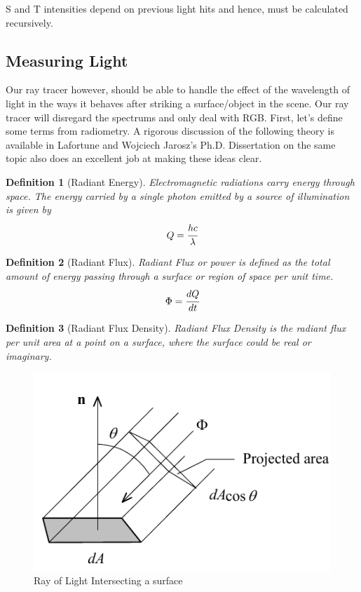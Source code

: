 \documentclass[a4paper, 12pt]{article}
\newtheorem{definition}{Definition}
\begin{document}
S and T intensities depend on previous light hits and hence, must be calculated 
recursively.

\subsection{Measuring Light}
Our ray tracer however, should be able to handle the effect of 
the wavelength of light in the ways it behaves after striking 
a surface/object in the scene. Our 
ray tracer will disregard the spectrums and 
only deal with RGB. First, let's define some terms from radiometry.
A rigorous discussion of the following theory is available in 
Lafortune\cite{Lafortune1995MathematicalMA} and Wojciech Jarosz's Ph.D. 
Dissertation\cite{jarosz08thesis} on the same topic also does an excellent job
at making these ideas clear.

\begin{definition}[Radiant Energy]
Electromagnetic radiations carry energy through space.
The energy carried by a single photon emitted by a source 
of illumination is given by 
$$
	Q = \cfrac{hc}{\lambda}
$$
\end{definition}

\begin{definition}[Radiant Flux]
Radiant Flux or power is defined as the total amount of energy passing 
through a surface or region of space per unit time.
$$
	\Phi = \cfrac{dQ}{dt}
$$
\end{definition}

\begin{definition}[Radiant Flux Density]
	Radiant Flux Density is the radiant flux per unit area at a 
	point on a surface, where the surface could be real or imaginary.
\end{definition}

\begin{center}
\begin{figure}
	\includegraphics[width=0.8\linewidth, scale=0.6]{raynormal.png}
	\centering
	\caption{Ray of Light Intersecting a surface}
	\label{figure:rayandnormal}
\end{figure}
\end{center}
\end{document}
